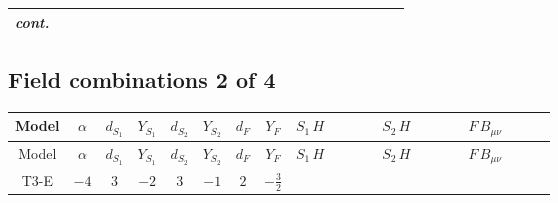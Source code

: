 \documentclass[8pt]{article}
\begin{document}
\begin{landscape}
\begin{longtable}{@{}cccccccc >{\raggedright\arraybackslash}p{0.21\linewidth} >{\raggedright\arraybackslash}p{0.21\linewidth} >{\raggedright\arraybackslash}p{0.21\linewidth}@{}}
\textit{cont.} &  &  &  &  &  &  &  & \scriptsize\adjustbox{max width=\linewidth}{$\begin{gathered} -\frac{2 \hbar  \log \left(\frac{\bar{\mu}^{2}}{m_2^2}\right) \overline{\lambda_5} H_{a_1} H_{a_2} m_2^2 \lambda_5 H_{a_1}{}^{\dagger } H_{a_2}{}^{\dagger }}{m_1^2-m_2^2}\end{gathered}$} &  &  \\
\midrule
\bottomrule
\end{longtable}
\clearpage
\subsection*{Field combinations 2 of 4}
\begin{longtable}{@{}cccccccc >{\raggedright\arraybackslash}p{0.21\linewidth} >{\raggedright\arraybackslash}p{0.21\linewidth} >{\raggedright\arraybackslash}p{0.21\linewidth}@{}}
\toprule
Model & $\alpha$ & $d_{S_1}$ & $Y_{S_1}$ & $d_{S_2}$ & $Y_{S_2}$ & $d_F$ & $Y_F$ & $S_1\,H$ & $S_2\,H$ & $F\,B_{\mu\nu}$ \\
\midrule
\endfirsthead
\toprule
Model & $\alpha$ & $d_{S_1}$ & $Y_{S_1}$ & $d_{S_2}$ & $Y_{S_2}$ & $d_F$ & $Y_F$ & $S_1\,H$ & $S_2\,H$ & $F\,B_{\mu\nu}$ \\
\midrule
\endhead
T3-E & $-4$ & $3$ & $-2$ & $3$ & $-1$ & $2$ & $-\frac{3}{2}$ & \scriptsize\adjustbox{max width=\linewidth}{$\begin{gathered} +\frac{3 \hbar  H_{a_1} H_{a_2} H_{a_1}{}^{\dagger } H_{a_2}{}^{\dagger } \left(\lambda_{HS_1}^{(1)}^{(2)}\right){}^2}{2 \epsilon } \\ +\frac{3}{2} \hbar  \log \left(\frac{\bar{\mu}^{2}}{m_1^2}\right) H_{a_1} H_{a_2} H_{a_1}{}^{\dagger } H_{a_2}{}^{\dagger } \left(\lambda_{HS_1}^{(1)}^{(2)}\right){}^2\end{gathered}$} & \scriptsize\adjustbox{max width=\linewidth}{$\begin{gathered} +\frac{3 \hbar  H_{a_1} H_{a_2} H_{a_1}{}^{\dagger } H_{a_2}{}^{\dagger } \left(\lambda_{HS_2}^{(1)}^{(2)}\right){}^2}{2 \epsilon } \\ +\frac{3}{2} \hbar  \log \left(\frac{\bar{\mu}^{2}}{m_2^2}\right) H_{a_1} H_{a_2} H_{a_1}{}^{\dagger } H_{a_2}{}^{\dagger } \left(\lambda_{HS_2}^{(1)}^{(2)}\right){}^2\end{gathered}$} & \scriptsize\adjustbox{max width=\linewidth}{$\begin{gathered} -\frac{9}{2} \hbar  \log \left(\frac{\bar{\mu}^{2}}{M_F^2}\right) B_{\mu _1\mu _2}^2\end{gathered}$} \\
\midrule
\bottomrule
\end{longtable}
\clearpage

\end{landscape}
\end{document}
